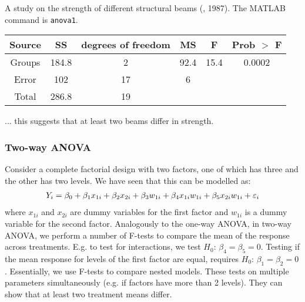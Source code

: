 \begin{example}
	A study on the strength of different structural beams (, 1987). The MATLAB command is \texttt{anova1}.
	
	\begin{center}
	\end{center}
	\begin{center}
		\begin{tabular}{c|c|c|c|c|c}
			\textbf{Source} & \textbf{SS} & \textbf{degrees of freedom} & \textbf{MS} & \textbf{F} & \textbf{Prob} $>$ \textbf{F} \\
			\hline
			Groups & 184.8 & 2 & 92.4 & 15.4 & 0.0002 \\
			Error & 102 & 17 & 6 & & \\
			Total & 286.8 & 19 & &
		\end{tabular}
	\end{center}
	
	... this suggests that at least two beams differ in strength.
\end{example}

\subsubsection{Two-way ANOVA}

Consider a complete factorial design with two factors, one of which has three and the other has two levels. We have seen that this can be modelled as:
\begin{align}
	Y_i = \beta_0 + \beta_1x_{1i} + \beta_2x_{2i} + \beta_3w_{1i} + \beta_4x_{1i}w_{1i} + \beta_5x_{2i}w_{1i} + \epsilon_i \notag
\end{align}
where $x_{1i}$ and $x_{2i}$ are dummy variables for the first factor and $w_{1i}$ is a dummy variable for the second factor. Analogously to the one-way ANOVA, in two-way ANOVA, we perform a number of F-tests to compare the mean of the response across treatments. E.g. to test for interactions, we test $H_0$: $\beta_4 = \beta_5 = 0$. Testing if the mean response for levels of the first factor are equal, requires $H_0$: $\beta_1 = \beta_2 = 0$. Essentially, we use F-tests to compare nested models. These tests on multiple parameters simultaneously (e.g. if factors have more than 2 levels). They can show that at least two treatment means differ.


